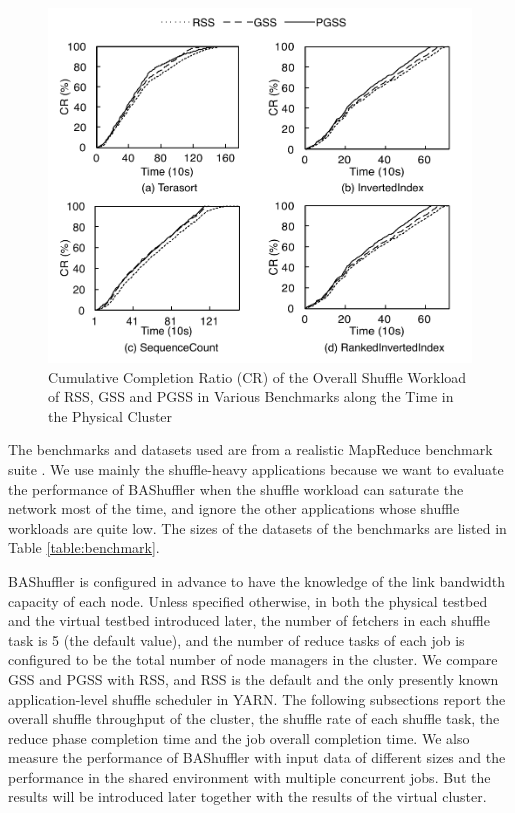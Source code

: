 \documentclass[10pt,journal,compsoc]{IEEEtran}
\begin{document}
\begin{figure}
\centering
\includegraphics[width=1\columnwidth]{figure5}
\caption{Cumulative Completion Ratio (CR) of the Overall Shuffle Workload of RSS, GSS and PGSS in Various Benchmarks along the Time
in the Physical Cluster} 
\label{fig:new_completion_ratio}
\end{figure}


The benchmarks and datasets used are from a realistic MapReduce benchmark suite \cite{ahmad2012puma}. 
We use mainly the shuffle-heavy applications because we want to evaluate the
performance of BAShuffler when the shuffle workload can saturate the
network most of the time,
and ignore the other applications whose shuffle workloads are quite
low. %
The sizes of the datasets of the benchmarks are listed in Table \ref{table:benchmark}.

BAShuffler is configured in advance to have the knowledge of
the link bandwidth capacity of each node.
Unless specified otherwise, %
in both the physical testbed and the virtual testbed introduced later, 
the number of fetchers in each shuffle task is 5 (the default value), 
and the number of reduce tasks of each job is configured to
be the total number of node managers in the cluster.
We compare GSS and PGSS with RSS, and RSS is the default and the only
presently known application-level shuffle scheduler in YARN. 
The following subsections report the overall shuffle throughput of
the cluster, the shuffle rate of each shuffle task, the reduce phase
completion time and the job overall completion time.
We also measure the performance of BAShuffler with input data of
different sizes
and the performance in the shared environment with multiple concurrent jobs. 
But the results will be introduced later together with the results of the virtual cluster. 
\end{document}
